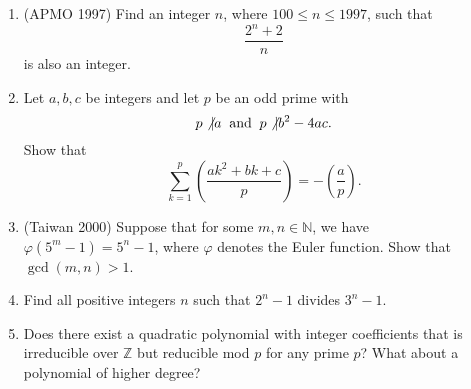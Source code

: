 \documentclass[11pt]{article}
\begin{document}
\begin{enumerate}
  \item (APMO 1997) Find an integer $n$, where $100 \leq n \leq 1997$, such that \[ \frac{2^n + 2}{n} \] is also an integer. 

  \item Let $a, b, c$ be integers and let $p$ be an odd prime with \[p \not\vert a \;\; \text{and}\;\; p \not\vert b^{2}-4ac.\] Show that \[\sum_{k=1}^{p}\left( \frac{ak^{2}+bk+c}{p}\right) = -\left(\frac{a}{p}\right).\]
  
  \item (Taiwan 2000) Suppose that for some $m,n \in \mathbb{N}$, we have $\varphi(5^m - 1) = 5^n - 1$, where $\varphi$ denotes the Euler function. Show that $\gcd(m,n) > 1$. 
  
  \item Find all positive integers $n$ such that $2^n - 1$ divides $3^n - 1$. 
  
  \item Does there exist a quadratic polynomial with integer coefficients that is irreducible over $\mathbb{Z}$ but reducible mod $p$ for any prime $p$? What about a polynomial of higher degree? 
\end{enumerate}
\end{document}
